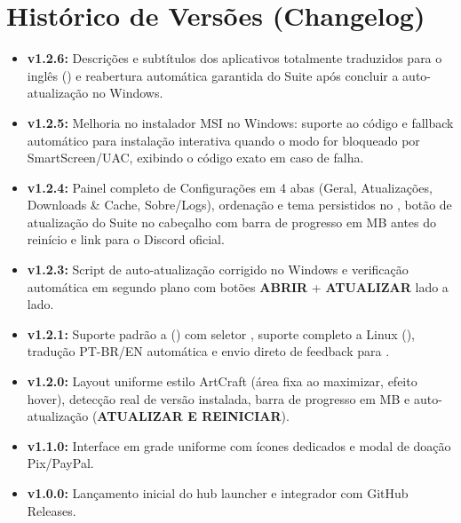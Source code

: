 \documentclass[11pt,a4paper]{article}
\begin{document}
\section{Histórico de Versões (Changelog)}
\begin{itemize}
  \item \textbf{v1.2.6:} Descrições e subtítulos dos aplicativos totalmente traduzidos para o inglês () e reabertura automática garantida do Suite após concluir a auto-atualização no Windows.
  \item \textbf{v1.2.5:} Melhoria no instalador MSI no Windows: suporte ao código  e fallback automático para instalação interativa quando o modo  for bloqueado por SmartScreen/UAC, exibindo o código exato em caso de falha.
  \item \textbf{v1.2.4:} Painel completo de Configurações em 4 abas (Geral, Atualizações, Downloads \& Cache, Sobre/Logs), ordenação e tema persistidos no , botão de atualização do Suite no cabeçalho com barra de progresso em MB antes do reinício e link para o Discord oficial.
  \item \textbf{v1.2.3:} Script de auto-atualização corrigido no Windows e verificação automática em segundo plano com botões \textbf{ABRIR} + \textbf{ATUALIZAR} lado a lado.
  \item \textbf{v1.2.1:} Suporte padrão a  () com seletor , suporte completo a Linux (), tradução PT-BR/EN automática e envio direto de feedback para .
  \item \textbf{v1.2.0:} Layout uniforme estilo ArtCraft (área fixa ao maximizar, efeito hover), detecção real de versão instalada, barra de progresso em MB e auto-atualização (\textbf{ATUALIZAR E REINICIAR}).
  \item \textbf{v1.1.0:} Interface em grade uniforme com ícones dedicados e modal de doação Pix/PayPal.
  \item \textbf{v1.0.0:} Lançamento inicial do hub launcher e integrador com GitHub Releases.
\end{itemize}
\end{document}
